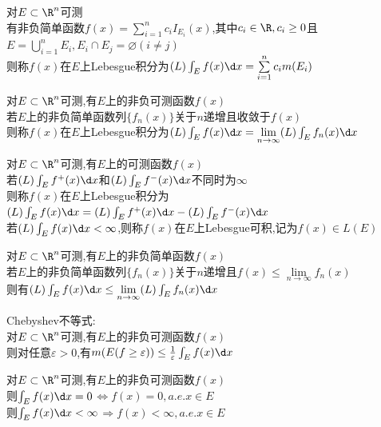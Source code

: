 \begin{dingyi}
对$E\subset\R^n$可测\\
有非负简单函数$f(x)=\sum\limits_{i=1}^{n}c_iI_{E_i}(x)$,其中$c_i\in\R,c_i\geq 0$且$E=\bigcup\limits_{i=1}^{n}E_i,E_i\cap E_j=\varnothing(i\neq j)$\\
则称$f(x)$在$E$上Lebesgue积分为$(L)\int_{E}f(x)\d x=\sum\limits_{i=1}^{n}c_im(E_i)$
\end{dingyi}

\begin{dingyi}
对$E\subset\R^n$可测,有$E$上的非负可测函数$f(x)$\\
若$E$上的非负简单函数列$\{f_n(x)\}$关于$n$递增且收敛于$f(x)$\\
则称$f(x)$在$E$上Lebesgue积分为$(L)\int_{E}f(x)\d x=\lim\limits_{n\to\infty}(L)\int_{E}f_n(x)\d x$
\end{dingyi}

\begin{dingyi}
对$E\subset\R^n$可测,有$E$上的可测函数$f(x)$\\
若$(L)\int_{E}f^{+}(x)\d x$和$(L)\int_{E}f^{-}(x)\d x$不同时为$\infty$\\
则称$f(x)$在$E$上Lebesgue积分为$(L)\int_{E}f(x)\d x=(L)\int_{E}f^{+}(x)\d x-(L)\int_{E}f^{-}(x)\d x$\\
若$(L)\int_{E}f(x)\d x<\infty$,则称$f(x)$在$E$上Lebesgue可积,记为$f(x)\in L(E)$
\end{dingyi}

\begin{dingli}
对$E\subset\R^n$可测,有$E$上的非负简单函数$f(x)$\\
若$E$上的非负简单函数列$\{f_n(x)\}$关于$n$递增且$f(x)\leq \lim\limits_{n\to \infty}f_n(x)$\\
则有$(L)\int_{E}f(x)\d x\leq\lim\limits_{n\to\infty}(L)\int_{E}f_n(x)\d x$
\end{dingli}

\begin{dingli}
Chebyshev不等式:\\
对$E\subset\R^n$可测,有$E$上的非负可测函数$f(x)$\\
则对任意$\varepsilon>0$,有$m(E(f\geq \varepsilon))\leq \frac{1}{\varepsilon}\int_{E}f(x)\d x$
\end{dingli}

\begin{dingli}
对$E\subset\R^n$可测,有$E$上的非负可测函数$f(x)$\\
则$\int_{E}f(x)\d x=0$$\Leftrightarrow$$f(x)=0,a.e.x\in E$\\
则$\int_{E}f(x)\d x<\infty$$\Rightarrow$$f(x)<\infty,a.e.x\in E$
\end{dingli}

